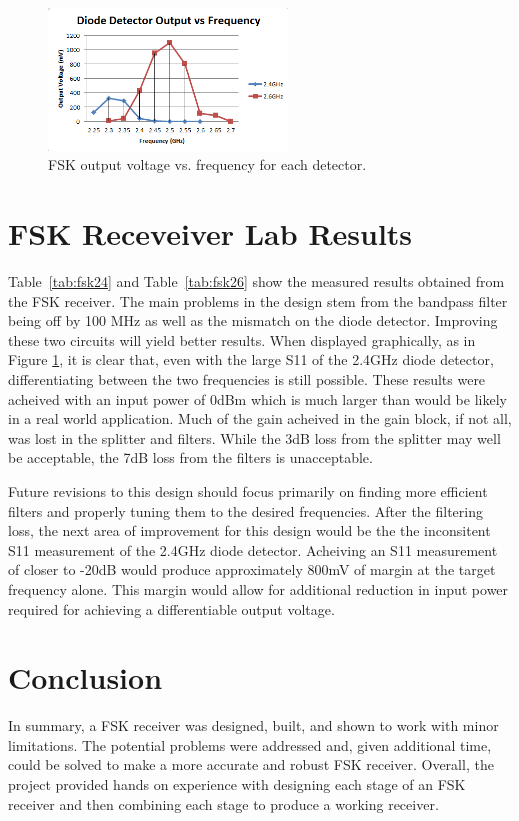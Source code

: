 \documentclass[conference]{IEEEtran}
\begin{document}
\begin{figure}[!htb]
\centering
\includegraphics[width=2.5in]{diode-pics/output_chart.PNG}
\caption{FSK output voltage vs. frequency for each detector.}
\label{fig:fsk_chart}
\end{figure}

\section{FSK Receveiver Lab Results}
Table~\ref{tab:fsk24} and Table~\ref{tab:fsk26} show the measured results obtained from the FSK receiver. The main problems in the design stem from the bandpass filter being off by 100 MHz as well as the mismatch on the diode detector. Improving these two circuits will yield better results. When displayed graphically, as in Figure \ref{fig:fsk_chart}, it is clear that, even with the large S11 of the 2.4GHz diode detector, differentiating between the two frequencies is still possible. These results were acheived with an input power of 0dBm which is much larger than would be likely in a real world application. Much of the gain acheived in the gain block, if not all, was lost in the splitter and filters. While the 3dB loss from the splitter may well be acceptable, the 7dB loss from the filters is unacceptable.

Future revisions to this design should focus primarily on finding more efficient filters and properly tuning them to the desired frequencies. After the filtering loss, the next area of improvement for this design would be the the inconsitent S11 measurement of the 2.4GHz diode detector. Acheiving an S11 measurement of closer to -20dB would produce approximately 800mV of margin at the target frequency alone. This margin would allow for additional reduction in input power required for achieving a differentiable output voltage.

\section{Conclusion}
In summary, a FSK receiver was designed, built, and shown to work with minor limitations.  The potential problems were addressed and, given additional time, could be solved to make a more accurate and robust FSK receiver.  Overall, the project provided hands on experience with designing each stage of an FSK receiver and then combining each stage to produce a working receiver.
\end{document}
